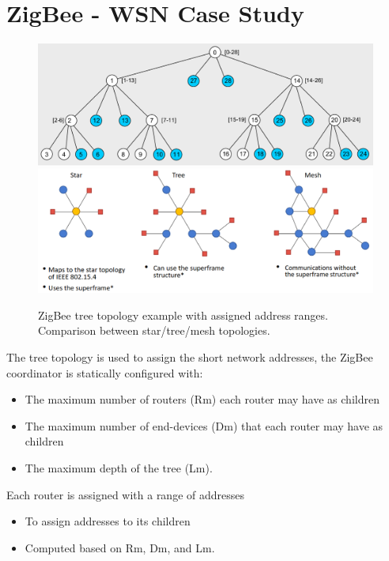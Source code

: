 \chapter{ZigBee - WSN Case Study}

\begin{figure}[htbp]
   \centering
   \includegraphics{images/zigbee_tree.png}\\
   \includegraphics{images/zigbee_networktopologies.png}
   \caption{ZigBee tree topology example with assigned address ranges. Comparison between star/tree/mesh topologies.}
   \label{fig:zigbee_tree}
\end{figure}

The tree topology is used to assign the short network addresses, the ZigBee coordinator is statically configured with:
\begin{itemize}
   \item The maximum number of routers (Rm) each router may have as
   children
   \item The maximum number of end-devices (Dm) that each router may
   have as children
   \item The maximum depth of the tree (Lm).
\end{itemize}
Each router is assigned with a range of addresses
\begin{itemize}
   \item To assign addresses to its children
   \item Computed based on Rm, Dm, and Lm.
\end{itemize}

